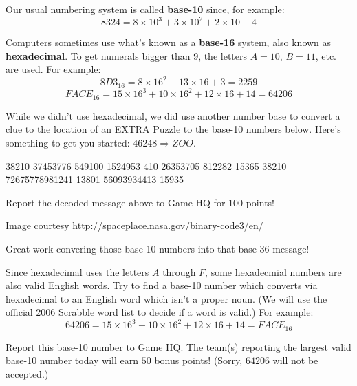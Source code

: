 
\begin{puzzle}
  Our usual numbering system is called \textbf{base-10} since, for example:
    \[
      8324 = 8\times 10^3 + 3\times 10^2 + 2\times 10 + 4
    \]


  Computers sometimes use what's known as a \textbf{base-16} system, also known
  as \textbf{hexadecimal}. To get numerals bigger than $9$, the letters $A=10$,
  $B=11$, etc. are used. For example:
    \[
      8D3_{16} = 8\times 16^2 + 13\times 16 + 3 = 2259
    \]
    \[
      FACE_{16} = 15\times 16^3 + 10\times 16^2 + 12\times 16 + 14 = 64206
    \]

  While we didn't use hexadecimal, we did use another number base to convert
  a clue to the location of an EXTRA Puzzle to the base-10 numbers below.
  Here's something to get you started: $46248\Rightarrow ZOO$.

  \vfill

  {\Large
  \begin{centerverbatim}
38210 37453776 549100 1524953 410 26353705 812282
15365 38210 72675778981241 13801 56093934413 15935
  \end{centerverbatim}
  }

  Report the decoded message above to Game HQ for \(100\) points!

  \vfill\vfill
  \centerline{
    \tiny
    Image courtesy http://spaceplace.nasa.gov/binary-code3/en/
  }
\end{puzzle}

\begin{extraPuzzle}
  Great work convering those base-10 numbers into
  that base-36 message!

  Since hexadecimal uses the letters \(A\) through \(F\), some hexadecmial
  numbers are also valid English words. Try to find a base-10 number
  which converts via hexadecimal to an English word which isn't a
  proper noun. (We will use the
  official 2006 Scrabble word list to decide if a word is valid.)
  For example:
    \[
      64206 = 15\times 16^3 + 10\times 16^2 + 12\times 16 + 14 = FACE_{16}
    \]

  Report this base-10 number to Game HQ.
  The team(s) reporting the largest valid base-10 number today
  will earn \(50\) bonus points! (Sorry, \(64206\) will not
  be accepted.)
\end{extraPuzzle}